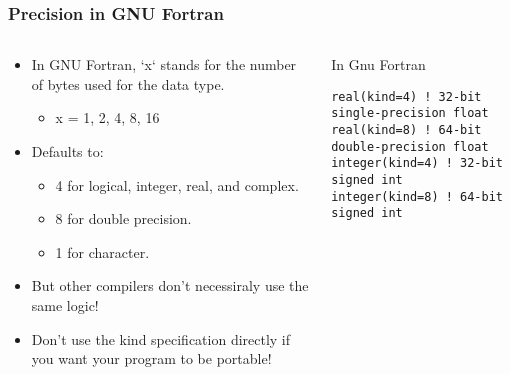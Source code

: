 \begin{frame}[fragile]
  \frametitle{Precision in GNU Fortran}
  \begin{columns}[T]
    \begin{column}{0.5\textwidth}
      \begin{itemize}
        \item In GNU Fortran, `x` stands for the number of bytes used for the data type.
            \begin{itemize}
            \item x = 1, 2, 4, 8, 16
          \end{itemize}
        \item Defaults to:
          \begin{itemize}
            \item 4 for logical, integer, real, and complex.
            \item 8 for double precision.
            \item 1 for character.
          \end{itemize}
        \item But other compilers don't necessiraly use the same logic!
        \item Don’t use the kind specification directly if you want your program to be portable!
      \end{itemize}
    \end{column}

    \begin{column}{0.5\textwidth}
        In Gnu Fortran\\

      \begin{lstlisting}
real(kind=4) ! 32-bit single-precision float
real(kind=8) ! 64-bit double-precision float
integer(kind=4) ! 32-bit signed int
integer(kind=8) ! 64-bit signed int
      \end{lstlisting}
    \end{column}
  \end{columns}
\end{frame}


